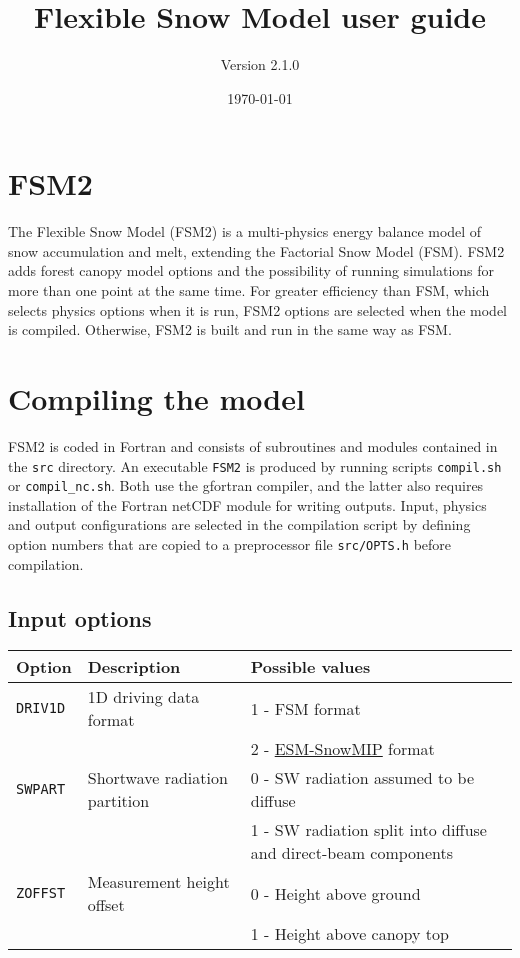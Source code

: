 \documentclass{article}
\title{Flexible Snow Model user guide}
\author{Version 2.1.0}
\date{\today}
\begin{document}
\maketitle
\parindent0pt

\section{FSM2}

The Flexible Snow Model (FSM2) is a multi-physics energy balance model of snow accumulation and melt, extending the Factorial Snow Model (FSM). FSM2 adds forest canopy model options and the possibility of running simulations for more than one point at the same time. For greater efficiency than FSM, which selects physics options when it is run, FSM2 options are selected when the model is compiled. Otherwise, FSM2 is built and run in the same way as FSM.

\section{Compiling the model}

FSM2 is coded in Fortran and consists of subroutines and modules contained in the {\tt src} directory. An executable {\tt FSM2} is produced by running scripts {\tt compil.sh} or {\tt compil\_nc.sh}. Both use the gfortran compiler, and the latter also requires installation of the Fortran netCDF module for writing outputs. Input, physics and output configurations are selected in the compilation script by defining option numbers that are copied to a preprocessor file {\tt src/OPTS.h} before compilation.

\subsection{Input options }
\begin{longtable}{|l|l|l|} \hline
Option       & Description & Possible values \\ \hline
{\tt DRIV1D} & 1D driving data format
&   1 - FSM format \\
& & 2 - \href{https://www.geos.ed.ac.uk/~ressery/ESM-SnowMIP/ESMSnowMIP_Reference_sites.pdf}{ESM-SnowMIP} format \\ \hline
{\tt SWPART} & Shortwave radiation partition
&   0 - SW radiation assumed to be diffuse \\
& & 1 - SW radiation split into diffuse and direct-beam components \\ \hline
{\tt ZOFFST} & Measurement height offset
&   0 - Height above ground \\
& & 1 - Height above canopy top \\ \hline
\end{longtable}
\end{document}
